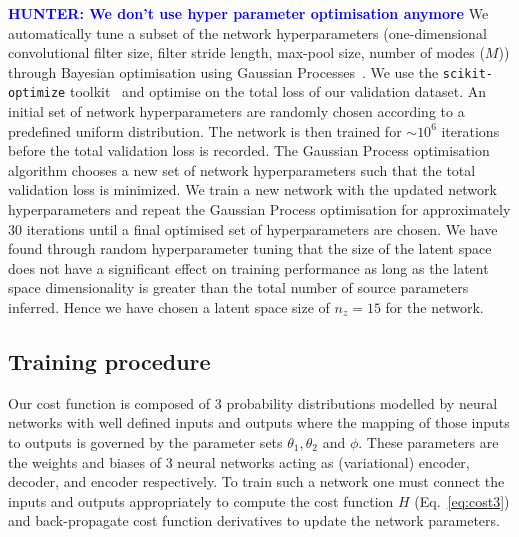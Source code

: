 \documentclass[%
showpacs,
nofootinbib,
 amsmath,amssymb,
 aps,
 twocolumn,
 prl,
 reprint,
floatfix,
]{revtex4-1}
\newcommand{\hunter}[1]{\textbf{\textcolor{blue}{HUNTER: #1}}}
\begin{document}
\hunter{We don't use hyper parameter optimisation anymore}
We automatically tune a subset of the network hyperparameters
(one-dimensional convolutional filter size, filter stride length, max-pool size, number of
modes ($M$)) through Bayesian optimisation using Gaussian
Processes~\cite{Siria2020.06.11.144253}. We use the \texttt{scikit-optimize}
toolkit~\cite{scikit-learn} and optimise on the total loss of our validation
dataset. An initial set of network hyperparameters are randomly chosen
according to a predefined uniform distribution. The network is then trained for
$\sim 10^6$ iterations before the total validation loss is recorded. The
Gaussian Process optimisation algorithm chooses a new set of network
hyperparameters such that the total validation loss is minimized. We train a
new network with the updated network hyperparameters and repeat the Gaussian
Process optimisation for approximately 30 iterations until a final optimised
set of hyperparameters are chosen. We have found through random hyperparameter
tuning that the size of the latent space does not have a significant effect on
training performance as long as the latent space dimensionality is greater than
the total number of source parameters inferred.  Hence we have chosen a latent
space size of $n_z=15$ for the network.

\subsection{Training procedure}\label{app:training_procedure}
%
%
Our cost function is composed of 3 probability distributions modelled by
neural networks with well defined inputs and outputs where the mapping of
those inputs to outputs is governed by the parameter sets
$\theta_{1},\theta_{2}$ and $\phi$. These parameters are the weights and biases
of 3 neural networks acting as (variational) encoder, decoder, and encoder
respectively. To train such a network one must connect the inputs and outputs
appropriately to compute the cost function $H$ (Eq.~\ref{eq:cost3}) and
back-propagate cost function derivatives to update the network parameters. 
\end{document}
